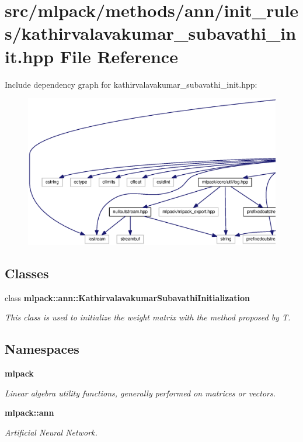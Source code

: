 \section{src/mlpack/methods/ann/init\+\_\+rules/kathirvalavakumar\+\_\+subavathi\+\_\+init.hpp File Reference}
\label{kathirvalavakumar__subavathi__init_8hpp}
Include dependency graph for kathirvalavakumar\+\_\+subavathi\+\_\+init.\+hpp\+:
\nopagebreak
\begin{figure}[H]
\begin{center}
\leavevmode
\includegraphics[width=350pt]{kathirvalavakumar__subavathi__init_8hpp__incl}
\end{center}
\end{figure}
\subsection*{Classes}
\begin{DoxyCompactItemize}
\item 
class {\bf mlpack\+::ann\+::\+Kathirvalavakumar\+Subavathi\+Initialization}
\begin{DoxyCompactList}\small\item\em This class is used to initialize the weight matrix with the method proposed by T. \end{DoxyCompactList}\end{DoxyCompactItemize}
\subsection*{Namespaces}
\begin{DoxyCompactItemize}
\item 
 {\bf mlpack}
\begin{DoxyCompactList}\small\item\em Linear algebra utility functions, generally performed on matrices or vectors. \end{DoxyCompactList}\item 
 {\bf mlpack\+::ann}
\begin{DoxyCompactList}\small\item\em Artificial Neural Network. \end{DoxyCompactList}\end{DoxyCompactItemize}


